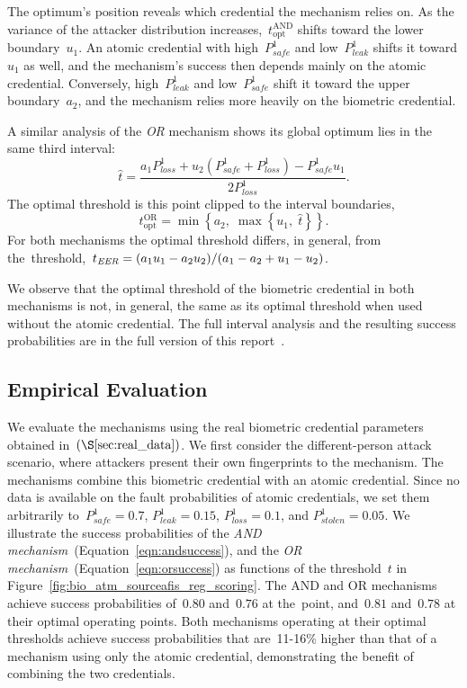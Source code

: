 \documentclass[conference,compsoc]{IEEEtran}
\begin{document}
The optimum's position reveals which credential the mechanism relies on.
As the variance of the attacker distribution increases,~$t_{\text{opt}}^{\mathrm{AND}}$ shifts toward the lower boundary~$u_1$.
An atomic credential with high~$P^1_{safe}$ and low~$P^1_{leak}$ shifts it toward $u_1$ as well, and the mechanism's success then depends mainly on the atomic credential.
Conversely, high~$P^1_{leak}$ and low~$P^1_{safe}$ shift it toward the upper boundary~$a_2$, and the mechanism relies more heavily on the biometric credential.

A similar analysis of the \emph{OR} mechanism shows its global optimum lies in the same third interval:
\begin{equation*}
\hat{t}
=
\frac{a_1 P^1_{loss} + u_2 (P^1_{safe} + P^1_{loss}) - P^1_{safe} u_1}{2 P^1_{loss}}.
\end{equation*}
The optimal threshold is this point clipped to the interval boundaries,
\begin{equation*}
t_{\text{opt}}^{\mathrm{OR}} = \min\left\{a_2,\;\max\left\{u_1,\;\hat{t}\right\}\right\}.
\end{equation*}
For both mechanisms the optimal threshold differs, in general, from the~\EER threshold,~$t_{\textit{EER}} = (a_1 u_1 - a_2 u_2)/(a_1 - a_2 + u_1 - u_2)$.

We observe that the optimal threshold of the biometric credential in both mechanisms is not, in general, the same as its optimal threshold when used without the atomic credential.
The full interval analysis and the resulting success probabilities are in the full version of this report~\cite{biometric_full_version}.

\subsection{Empirical Evaluation}\label{sec:two_credentials_empirical_eval}
\noindent
We evaluate the mechanisms using the real biometric credential parameters obtained in~$(\S\ref{sec:real_data})$.
We first consider the different-person attack scenario, where attackers present their own fingerprints to the mechanism. The mechanisms combine this biometric credential with an atomic credential. Since no data is available on the fault probabilities of atomic credentials, we set them arbitrarily to~$P^1_{safe} = 0.7$, $P^1_{leak} = 0.15$, $P^1_{loss} = 0.1$, and $P^1_{stolen} = 0.05$. We illustrate  the success probabilities of the \emph{AND mechanism}~(Equation~\ref{eqn:andsuccess}), and the \emph{OR mechanism}~(Equation~\ref{eqn:orsuccess}) as functions of the threshold~$t$ in Figure~\ref{fig:bio_atm_sourceafis_reg_scoring}. The AND and OR mechanisms achieve success probabilities of~$0.80$ and~$0.76$ at the~\EER point, and~$0.81$ and~$0.78$ at their optimal operating points. Both mechanisms operating at their optimal thresholds achieve success probabilities that are~11-16\% higher than that of a mechanism using only the atomic credential, demonstrating the benefit of combining the two credentials.
\end{document}
